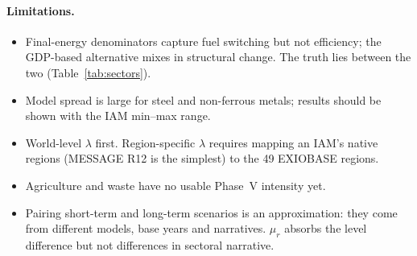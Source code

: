 \documentclass[11pt,a4paper]{article}
\begin{document}
\paragraph{Limitations.}
\begin{itemize}
  \item Final-energy denominators capture fuel switching but not efficiency;
        the GDP-based alternative mixes in structural change. The truth lies
        between the two (Table~\ref{tab:sectors}).
  \item Model spread is large for steel and non-ferrous metals; results
        should be shown with the IAM min--max range.
  \item World-level $\lambda$ first. Region-specific $\lambda$ requires
        mapping an IAM's native regions (MESSAGE R12 is the simplest) to the
        49 EXIOBASE regions.
  \item Agriculture and waste have no usable Phase~V intensity yet.
  \item Pairing short-term and long-term scenarios is an approximation: they
        come from different models, base years and narratives. $\mu_r$
        absorbs the level difference but not differences in sectoral
        narrative.
\end{itemize}
\end{document}
